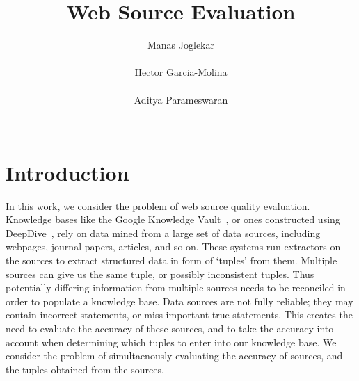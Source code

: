 \documentclass{sig-alternate}
\newcounter{prob}
\begin{document}
\title{Web Source Evaluation}
\author{
\alignauthor
Manas Joglekar\\
       \\
\alignauthor
Hector Garcia-Molina\\
       \\
\alignauthor 
Aditya Parameswaran\\
       \\
}
\maketitle

\begin{abstract}
\end{abstract}


\section{Introduction}
In this work, we consider the problem of web source quality evaluation. Knowledge bases like the Google Knowledge Vault~\cite{Dong:2014:KVW:2623330.2623623}, or ones constructed using DeepDive~\cite{Niu_deepdive:web-scale}, rely on data mined from a large set of data sources, including webpages, journal papers, articles, and so on. These systems run extractors on the sources to extract structured data in form of `tuples' from them. Multiple sources can give us the same tuple, or possibly inconsistent tuples. Thus potentially differing information from multiple sources needs to be reconciled in order to populate a knowledge base. Data sources are not fully reliable; they may contain incorrect statements, or miss important true statements. This creates the need to evaluate the accuracy of these sources, and to take the accuracy into account when determining which tuples to enter into our knowledge base. We consider the problem of simultaenously evaluating the accuracy of sources, and the tuples obtained from the sources. 
\end{document}

